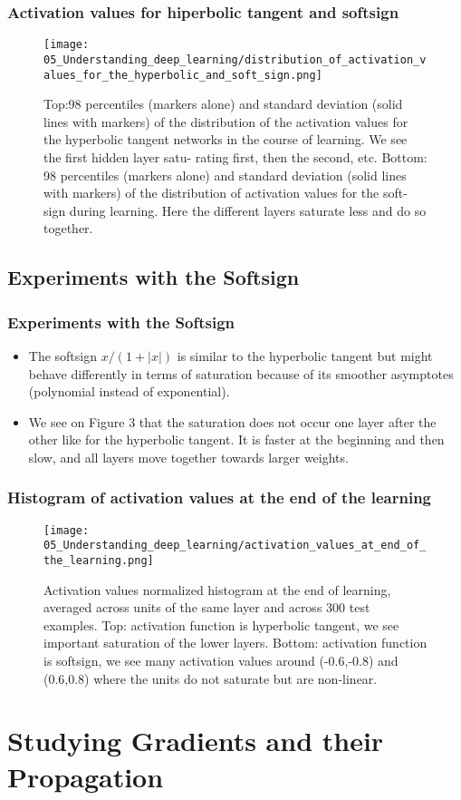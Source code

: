 \begin{frame}
  \frametitle{Activation values for hiperbolic tangent and softsign}

  \begin{figure}[t]
    \centering
    \texttt{[image: 05\_Understanding\_deep\_learning/distribution\_of\_activation\_values\_for\_the\_hyperbolic\_and\_soft\_sign.png]}
    \caption{
      Top:98 percentiles (markers alone) and standard deviation (solid lines with markers) of the distribution of the activation values for the hyperbolic tangent networks in the course of learning. We see the first hidden layer satu- rating first, then the second, etc. Bottom: 98 percentiles (markers alone) and standard deviation (solid lines with markers) of the distribution of activation values for the soft- sign during learning. Here the different layers saturate less and do so together.
    }
  \end{figure}

\end{frame}

\subsection{Experiments with the Softsign}


\begin{frame}
  \frametitle{Experiments with the Softsign}

  \begin{itemize}
    \item The softsign $x/(1+|x|)$ is similar to the hyperbolic tangent but might behave differently in terms of saturation because of its smoother asymptotes (polynomial instead of exponential). 
    
    \item We see on Figure 3 that the saturation does not occur one layer after the other like for the hyperbolic tangent. It is faster at the beginning and then slow, and all layers move together towards larger weights.
  \end{itemize}

\end{frame}

\begin{frame}
  \frametitle{Histogram of activation values at the end of the learning}
\begin{figure}[t]
  \centering
  \texttt{[image: 05\_Understanding\_deep\_learning/activation\_values\_at\_end\_of\_the\_learning.png]}
  \caption{
    Activation values normalized histogram at the end of learning, averaged across units of the same layer and across 300 test examples. Top: activation function is hyperbolic tangent, we see important saturation of the lower layers. Bottom: activation function is softsign, we see many activation values around (-0.6,-0.8) and (0.6,0.8) where the units do not saturate but are non-linear.
  }
\end{figure}
  
\end{frame}

\section{Studying Gradients and their Propagation}


    
